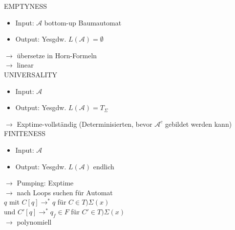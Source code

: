 \documentclass[titlepage]{article}
\begin{document}
EMPTYNESS
\begin{itemize}
	\item Input: $\mathcal{A}$ bottom-up Baumautomat
	\item Output: \glqq Yes\grqq gdw. $L(\mathcal{A}) = \emptyset$
\end{itemize}

$\rightarrow$ \"ubersetze in Horn-Formeln\\
$\rightarrow$ linear\\

UNIVERSALITY
\begin{itemize}
	\item Input: $\mathcal{A}$
	\item Output: \glqq Yes\grqq gdw. $L(\mathcal{A}) = T_\Sigma$
\end{itemize}

$\rightarrow$ Exptime-vollst\"andig (Determinisierten, bevor $\mathcal{A}^c$ gebildet werden kann)\\

FINITENESS
\begin{itemize}
	\item Input: $\mathcal{A}$
	\item Output: \glqq Yes\grqq gdw. $L(\mathcal{A})$ endlich
\end{itemize}

$\rightarrow$ Pumping: Exptime\\
$\rightarrow$ nach Loops suchen f\"ur Automat\\
$q$ mit $C[q] \to^\ast q$ f\"ur $C \in T)\Sigma(x)$\\
und $C'[q] \to^\ast q_f \in F$ f\"ur $C' \in T)\Sigma(x)$\\
$\rightarrow$ polynomiell\\
\end{document}
